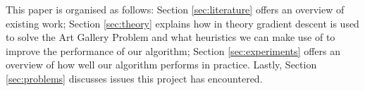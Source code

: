 This paper is organised as follows: Section \ref{sec:literature} offers an overview of existing work; Section \ref{sec:theory} explains how in theory gradient descent is used to solve the Art Gallery Problem and what heuristics we can make use of to improve the performance of our algorithm; Section \ref{sec:experiments} offers an overview of how well our algorithm performs in practice. Lastly, Section \ref{sec:problems} discusses issues this project has encountered.
